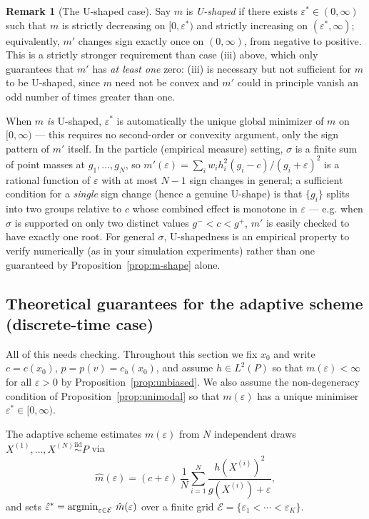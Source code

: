 \documentclass[11pt,reqno]{amsart}
\newcommand{\argmin}{\operatornamewithlimits{argmin}}
\theoremstyle{definition}
\newtheorem{rem}[thm]{Remark}
\newcommand{\note}[1]{{\color{Sienna} #1}}
\begin{document}
{\begin{rem}[The U-shaped case]
Say $m$ is \emph{U-shaped} if there exists $\varepsilon^\ast \in (0,\infty)$ such that $m$ is strictly decreasing on $[0,\varepsilon^\ast)$ and strictly increasing on $(\varepsilon^\ast,\infty)$; equivalently, $m'$ changes sign exactly once on $(0,\infty)$, from negative to positive. This is a strictly stronger requirement than case (iii) above, which only guarantees that $m'$ has \emph{at least one} zero: (iii) is necessary but not sufficient for $m$ to be U-shaped, since $m$ need not be convex and $m'$ could in principle vanish an odd number of times greater than one.

When $m$ \emph{is} U-shaped, $\varepsilon^\ast$ is automatically the unique global minimizer of $m$ on $[0,\infty)$ --- this requires no second-order or convexity argument, only the sign pattern of $m'$ itself. In the particle (empirical measure) setting, $\sigma$ is a finite sum of point masses at $g_1,\dots,g_N$, so $m'(\varepsilon) = \sum_i w_i h_i^2 (g_i-c)/(g_i+\varepsilon)^2$ is a rational function of $\varepsilon$ with at most $N-1$ sign changes in general; a sufficient condition for a \emph{single} sign change (hence a genuine U-shape) is that $\{g_i\}$ splits into two groups relative to $c$ whose combined effect is monotone in $\varepsilon$ --- e.g. when $\sigma$ is supported on only two distinct values $g^- < c < g^+$, $m'$ is easily checked to have exactly one root. For general $\sigma$, U-shapedness is an empirical property to verify numerically (as in your simulation experiments) rather than one guaranteed by Proposition~\ref{prop:m-shape} alone.
\end{rem}
}

\subsection{Theoretical guarantees for the adaptive scheme (discrete-time case)}

\note{All of this needs checking.}
Throughout this section we fix $x_0$ and write $c = c(x_0)$,
$p = p(v) = c_h(x_0)$, and assume $h \in L^2(P)$ so that
$m(\varepsilon) < \infty$ for all $\varepsilon > 0$ by
Proposition~\ref{prop:unbiased}. We also assume the non-degeneracy condition
of Proposition~\ref{prop:unimodal} so that $m(\varepsilon)$ has a unique
minimiser $\varepsilon^* \in [0,\infty)$.

The adaptive scheme estimates $m(\varepsilon)$ from $N$ independent draws
$X^{(1)},\ldots,X^{(N)} \overset{\mathrm{iid}}{\sim} P$ via
\[
  \hat{m}(\varepsilon) = (c+\varepsilon)\,\frac{1}{N}\sum_{i=1}^N
    \frac{h(X^{(i)})^2}{g(X^{(i)})+\varepsilon},
\]
and sets $\hat{\varepsilon}^* = \argmin_{\varepsilon\in\mathcal{E}}\,\hat{m}(\varepsilon)$
over a finite grid $\mathcal{E} = \{\varepsilon_1 < \cdots < \varepsilon_K\}$.
\end{document}
